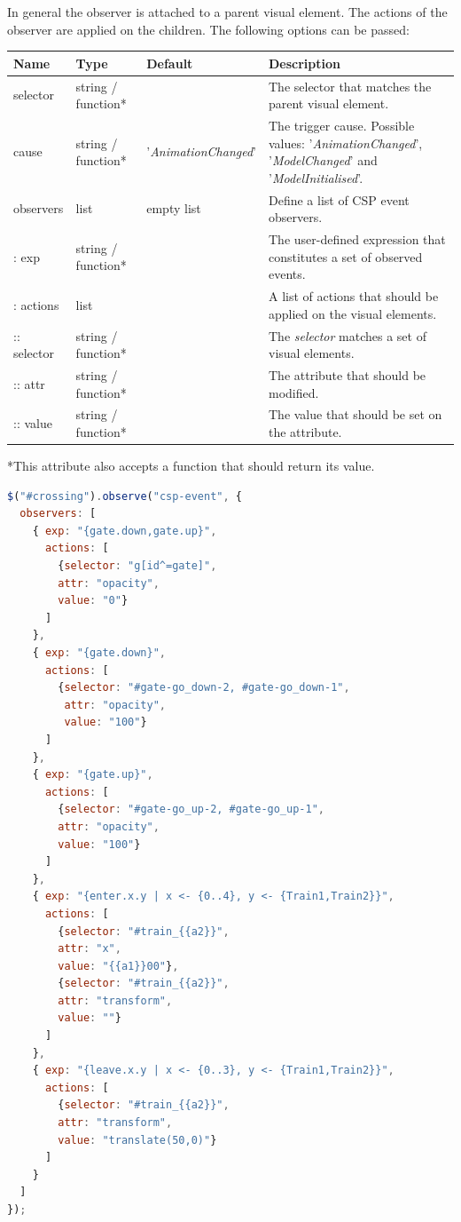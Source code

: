 In general the observer is attached to a parent visual element.
The actions of the observer are applied on the children.
The following options can be passed:

\vspace{0.5cm}
\begin{tabular}{ l l l p{7cm} }
  \textbf{Name} & \textbf{Type} & \textbf{Default} & \textbf{Description} \\
  \hline\noalign{\medskip}
  selector & string / function* & & The selector that matches the parent visual element. \\
  \hline\noalign{\medskip}
  cause & string / function* & '\textit{AnimationChanged}' & The trigger cause. Possible values: '\textit{AnimationChanged}', '\textit{ModelChanged}' and '\textit{ModelInitialised}'. \\  
  \hline\noalign{\medskip}
  observers & list & empty list & Define a list of CSP event observers. \\
  \hline\noalign{\medskip}
  : exp & string / function* & & The user-defined expression that constitutes a set of observed events.\\
  \hline\noalign{\medskip}
  : actions & list & & A list of actions that should be applied on the visual elements. \\
  \hline\noalign{\medskip}
  :: selector & string / function* & & The \textit{selector} matches a set of visual elements. \\
  \hline\noalign{\medskip}
  :: attr & string / function* & & The attribute that should be modified. \\
  \hline\noalign{\medskip}
  :: value & string / function* & & The value that should be set on the attribute. \\
\end{tabular}

*This attribute also accepts a function that should return its value.

\begin{lstlisting}[language=JavaScript]
$("#crossing").observe("csp-event", {
  observers: [
    { exp: "{gate.down,gate.up}",
      actions: [
        {selector: "g[id^=gate]", 
        attr: "opacity", 
        value: "0"}
      ]
    },
    { exp: "{gate.down}",
      actions: [
        {selector: "#gate-go_down-2, #gate-go_down-1", 
         attr: "opacity", 
         value: "100"}
      ]
    },
    { exp: "{gate.up}",
      actions: [
        {selector: "#gate-go_up-2, #gate-go_up-1", 
        attr: "opacity", 
        value: "100"}
      ]
    },
    { exp: "{enter.x.y | x <- {0..4}, y <- {Train1,Train2}}",
      actions: [
        {selector: "#train_{{a2}}", 
        attr: "x", 
        value: "{{a1}}00"},        
        {selector: "#train_{{a2}}", 
        attr: "transform", 
        value: ""}
      ]
    },
    { exp: "{leave.x.y | x <- {0..3}, y <- {Train1,Train2}}",
      actions: [
        {selector: "#train_{{a2}}", 
        attr: "transform",
        value: "translate(50,0)"}
      ]
    }
  ]
});
\end{lstlisting}